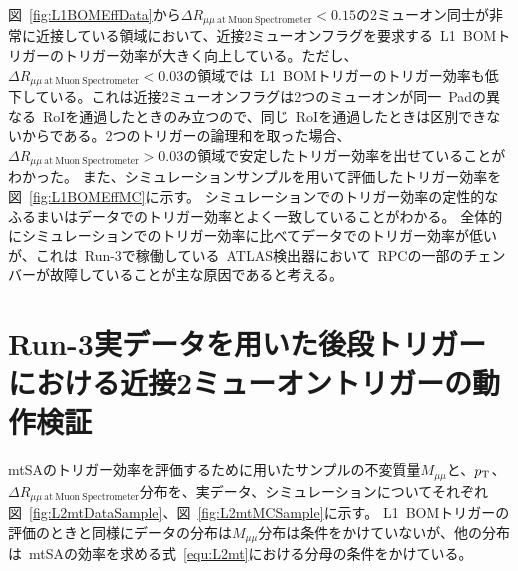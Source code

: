 図~\ref{fig:L1BOMEffData}から$\Delta R_{\mu\mu~\mathrm{at~Muon~Spectrometer}}<0.15$の2ミューオン同士が非常に近接している領域において、近接2ミューオンフラグを要求する~L1~BOMトリガーのトリガー効率が大きく向上している。ただし、$\Delta R_{\mu\mu~\mathrm{at~Muon~Spectrometer}}<0.03$の領域では~L1~BOMトリガーのトリガー効率も低下している。これは近接2ミューオンフラグは2つのミューオンが同一~Padの異なる~RoIを通過したときのみ立つので、同じ~RoIを通過したときは区別できないからである。2つのトリガーの論理和を取った場合、$\Delta R_{\mu\mu~\mathrm{at~Muon~Spectrometer}}>0.03$の領域で安定したトリガー効率を出せていることがわかった。
また、シミュレーションサンプルを用いて評価したトリガー効率を図~\ref{fig:L1BOMEffMC}に示す。
シミュレーションでのトリガー効率の定性的なふるまいはデータでのトリガー効率とよく一致していることがわかる。
全体的にシミュレーションでのトリガー効率に比べてデータでのトリガー効率が低いが、これは~Run-3で稼働している~ATLAS検出器において~RPCの一部のチェンバーが故障していることが主な原因であると考える。

\section{Run-3実データを用いた後段トリガーにおける近接2ミューオントリガーの動作検証}\label{chapter4-4}

mtSAのトリガー効率を評価するために用いたサンプルの不変質量$M_{\mu\mu}$と、$p_\mathrm{T}$、$\Delta R_{\mu\mu~\mathrm{at~Muon~Spectrometer}}$分布を、実データ、シミュレーションについてそれぞれ図~\ref{fig:L2mtDataSample}、図~\ref{fig:L2mtMCSample}に示す。
L1~BOMトリガーの評価のときと同様にデータの分布は$M_{\mu\mu}$分布は条件をかけていないが、他の分布は~mtSAの効率を求める式~\ref{equ:L2mt}における分母の条件をかけている。

